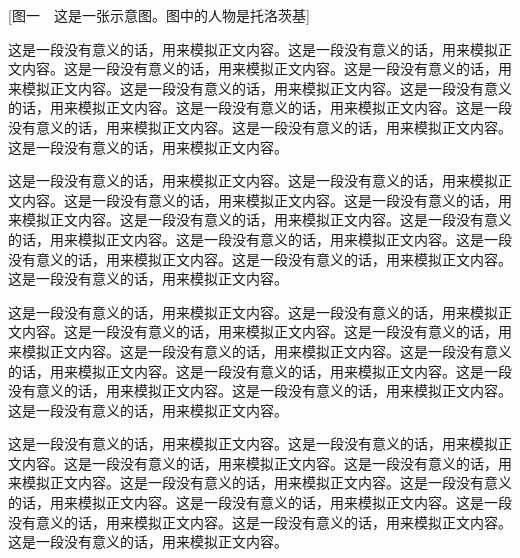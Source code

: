 [图一　这是一张示意图。图中的人物是托洛茨基]

这是一段没有意义的话，用来模拟正文内容。这是一段没有意义的话，用来模拟正文内容。这是一段没有意义的话，用来模拟正文内容。这是一段没有意义的话，用来模拟正文内容。这是一段没有意义的话，用来模拟正文内容。这是一段没有意义的话，用来模拟正文内容。这是一段没有意义的话，用来模拟正文内容。这是一段没有意义的话，用来模拟正文内容。这是一段没有意义的话，用来模拟正文内容。这是一段没有意义的话，用来模拟正文内容。


这是一段没有意义的话，用来模拟正文内容。这是一段没有意义的话，用来模拟正文内容。这是一段没有意义的话，用来模拟正文内容。这是一段没有意义的话，用来模拟正文内容。这是一段没有意义的话，用来模拟正文内容。这是一段没有意义的话，用来模拟正文内容。这是一段没有意义的话，用来模拟正文内容。这是一段没有意义的话，用来模拟正文内容。这是一段没有意义的话，用来模拟正文内容。这是一段没有意义的话，用来模拟正文内容。

\hr{}

这是一段没有意义的话，用来模拟正文内容。这是一段没有意义的话，用来模拟正文内容。这是一段没有意义的话，用来模拟正文内容。这是一段没有意义的话，用来模拟正文内容。这是一段没有意义的话，用来模拟正文内容。这是一段没有意义的话，用来模拟正文内容。这是一段没有意义的话，用来模拟正文内容。这是一段没有意义的话，用来模拟正文内容。这是一段没有意义的话，用来模拟正文内容。这是一段没有意义的话，用来模拟正文内容。

\todo{}

这是一段没有意义的话，用来模拟正文内容。这是一段没有意义的话，用来模拟正文内容。这是一段没有意义的话，用来模拟正文内容。这是一段没有意义的话，用来模拟正文内容。这是一段没有意义的话，用来模拟正文内容。这是一段没有意义的话，用来模拟正文内容。这是一段没有意义的话，用来模拟正文内容。这是一段没有意义的话，用来模拟正文内容。这是一段没有意义的话，用来模拟正文内容。这是一段没有意义的话，用来模拟正文内容。

